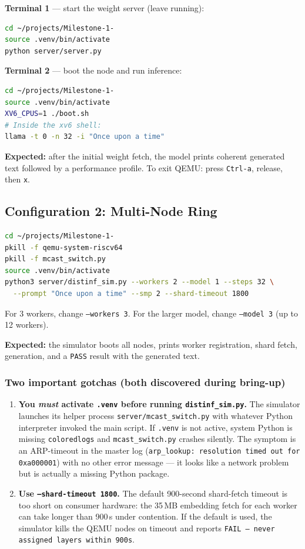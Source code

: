 \documentclass[11pt,a4paper]{article}
\begin{document}
\textbf{Terminal 1} --- start the weight server (leave running):
\begin{lstlisting}[language=bash]
cd ~/projects/Milestone-1-
source .venv/bin/activate
python server/server.py
\end{lstlisting}

\textbf{Terminal 2} --- boot the node and run inference:
\begin{lstlisting}[language=bash]
cd ~/projects/Milestone-1-
source .venv/bin/activate
XV6_CPUS=1 ./boot.sh
# Inside the xv6 shell:
llama -t 0 -n 32 -i "Once upon a time"
\end{lstlisting}

\textbf{Expected:} after the initial weight fetch, the model prints coherent generated text followed by a performance profile. To exit QEMU: press \texttt{Ctrl-a}, release, then \texttt{x}.

\subsection{Configuration 2: Multi-Node Ring}

\begin{lstlisting}[language=bash]
cd ~/projects/Milestone-1-
pkill -f qemu-system-riscv64
pkill -f mcast_switch.py
source .venv/bin/activate
python3 server/distinf_sim.py --workers 2 --model 1 --steps 32 \
  --prompt "Once upon a time" --smp 2 --shard-timeout 1800
\end{lstlisting}

For 3 workers, change \texttt{--workers 3}. For the larger model, change \texttt{--model 3} (up to 12 workers).

\textbf{Expected:} the simulator boots all nodes, prints worker registration, shard fetch, generation, and a \texttt{PASS} result with the generated text.

\subsubsection*{Two important gotchas (both discovered during bring-up)}

\begin{enumerate}[leftmargin=*]
\item \textbf{You \emph{must} activate \texttt{.venv} before running \texttt{distinf\_sim.py}.} The simulator launches its helper process \texttt{server/mcast\_switch.py} with whatever Python interpreter invoked the main script. If \texttt{.venv} is not active, system Python is missing \texttt{coloredlogs} and \texttt{mcast\_switch.py} crashes silently. The symptom is an ARP-timeout in the master log (\texttt{arp\_lookup: resolution timed out for 0xa000001}) with no other error message --- it looks like a network problem but is actually a missing Python package.

\item \textbf{Use \texttt{--shard-timeout 1800}.} The default 900-second shard-fetch timeout is too short on consumer hardware: the 35\,MB embedding fetch for each worker can take longer than 900\,s under contention. If the default is used, the simulator kills the QEMU nodes on timeout and reports \texttt{FAIL -- never assigned layers within 900s}.
\end{enumerate}
\end{document}
